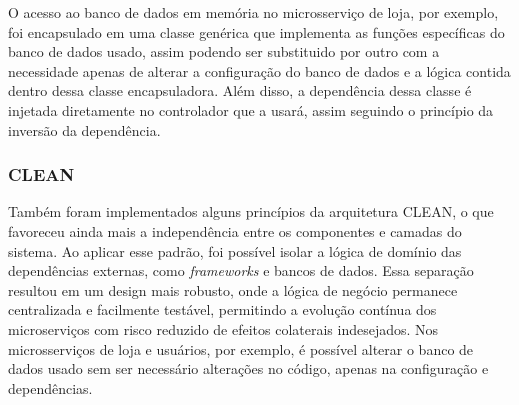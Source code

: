 O acesso ao banco de dados em memória no microsserviço de loja, por exemplo, foi encapsulado em uma classe genérica que implementa as funções específicas do banco de dados usado, assim podendo ser substituido por outro com a necessidade apenas de alterar a configuração do banco de dados e a lógica contida dentro dessa classe encapsuladora. Além disso, a dependência dessa classe é injetada diretamente no controlador que a usará, assim seguindo o princípio da inversão da dependência.


\subsubsection*{CLEAN}
Também foram implementados alguns princípios da arquitetura CLEAN, o que favoreceu ainda mais a independência entre os componentes e camadas do sistema. Ao aplicar esse padrão, foi possível isolar a lógica de domínio das dependências externas, como \emph{frameworks} e bancos de dados. Essa separação resultou em um design mais robusto, onde a lógica de negócio permanece centralizada e facilmente testável, permitindo a evolução contínua dos microserviços com risco reduzido de efeitos colaterais indesejados.
Nos microsserviços de loja e usuários, por exemplo, é possível alterar o banco de dados usado sem ser necessário alterações no código, apenas na configuração e dependências.


